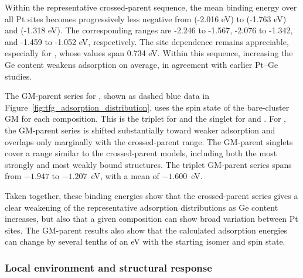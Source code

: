 Within the representative  crossed-parent sequence, the mean binding
energy over all Pt sites becomes progressively less negative from
 (-2.016 eV) to
 (-1.763 eV) and  (-1.318 eV). The corresponding
ranges are -2.246 to -1.567, -2.076 to -1.342, and -1.459 to -1.052 eV,
respectively. The site dependence remains appreciable, especially for
, whose
values span 0.734 eV. Within this sequence, increasing the Ge content weakens
 adsorption on average, in agreement with earlier Pt--Ge
studies.\cite{ugartemendia:2021,ugartemendia:2022}

The GM-parent series for , shown as dashed blue data in
Figure~\ref{fig:tfg_adsorption_distribution}, uses the spin state of the
bare-cluster GM for each composition. {This is the triplet for
 and the singlet for  and .} For
, the GM-parent series is shifted
substantially toward weaker adsorption and overlaps only marginally with the
crossed-parent range. The  GM-parent singlets cover a range
similar to the crossed-parent models, including both the most strongly and
most weakly bound structures. The  triplet GM-parent series spans
from $-1.947$ to $-1.207$~eV, with a mean of $-1.600$~eV.

Taken together,
these binding energies show that the crossed-parent series
gives a clear weakening of the representative  adsorption distributions as Ge
content increases,
but also that a given composition can show broad variation between Pt sites.
The GM-parent results also show that the calculated adsorption energies can
change by several tenths of an eV with the starting isomer and spin state.

\subsubsection{Local environment and structural response}

